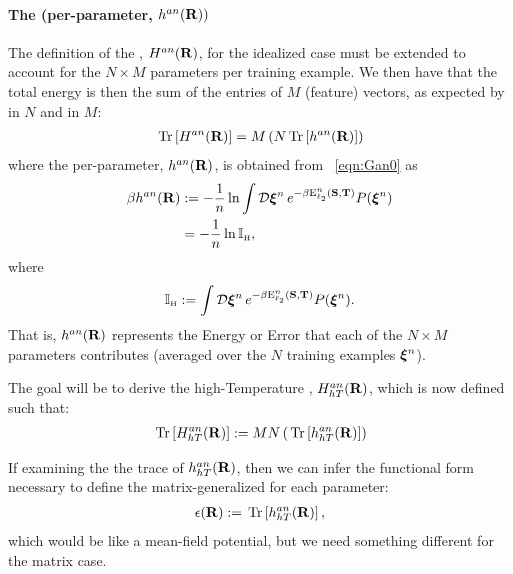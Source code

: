 \paragraph{The \AnnealedHamiltonian (per-parameter, $h^{an}(\mathbf{R}))$}
The definition of the \AnnealedHamiltonian, $H^{an}(\mathbf{R})$, for the idealized case must be extended to account for the $N\times M$ parameters per training example.  We then have that the total energy is then the sum of the entries of $M$ (feature) vectors, as expected by 
\SizeExtensivity in $N$ and
\SizeConsistency in $M$:
\begin{align}
 \label{eqn:hanpp}
 \mbox{}\operatorname{Tr}\left[H^{an}(\mathbf{R})\right]=M\left(N\mbox{}\operatorname{Tr}\left[h^{an}(\mathbf{R})\right]\right)
\end{align}
where the \AnnealedHamiltonian per-parameter, $h^{an}(\mathbf{R})$, is obtained from \EQN~\ref{eqn:Gan0} as
\begin{align}
\label{eqn:Gan_lnI}
\beta h^{an}(\mathbf{R})
   &:=-\frac{1}{n}\ln   \int\mathcal{D}\boldsymbol{\xi}^{n} \, e^{-\beta \mathbf{\mathrm{E}}^{n}_{\ell_2}({\mathbf{S}},{\mathbf{T}})} P(\boldsymbol{\xi}^{n}) \\
\nonumber
   &=-\frac{1}{n}\ln \mathbb{I}_{\text{\tiny H}} ,
\end{align}
where
\begin{align}
\label{eqn:InsideGan}
\mathbb{I}_{\text{\tiny H}} := \int\mathcal{D}\boldsymbol{\xi}^{n} \, e^{-\beta \mathbf{\mathrm{E}}^{n}_{\ell_2}({\mathbf{S}},{\mathbf{T}})} P(\boldsymbol{\xi}^{n}) .
\end{align}
That is, $h^{an}(\mathbf{R})$ represents the Energy or Error that each of the $N\times M$ parameters contributes
(averaged over the $N$ training examples $\boldsymbol{\xi}^{n}$).

The goal will be to derive the high-Temperature \AnnealedHamiltonian, $H^{an}_{hT}(\mathbf{R})$, which is now  defined such that:
\begin{align}
 \label{eqn:hanpp2}
  \mbox{}\operatorname{Tr}\left[H^{an}_{hT}(\mathbf{R})\right]:=MN\left(\mbox{}\operatorname{Tr}\left[h^{an}_{hT}(\mathbf{R})  \right]\right)
\end{align}

If examining the the trace of $h^{an}_{hT}(\mathbf{R})$, then we can infer the functional form necessary to define
the matrix-generalized \EffectivePotential for each parameter:
\begin{align}
  \label{eqn:EPSL_mat}
  \epsilon(\mathbf{R}):=\mbox{}\operatorname{Tr}\left[h^{an}_{hT}(\mathbf{R})\right],
\end{align}
which would be like a mean-field potential, but we need something different for the matrix case.


